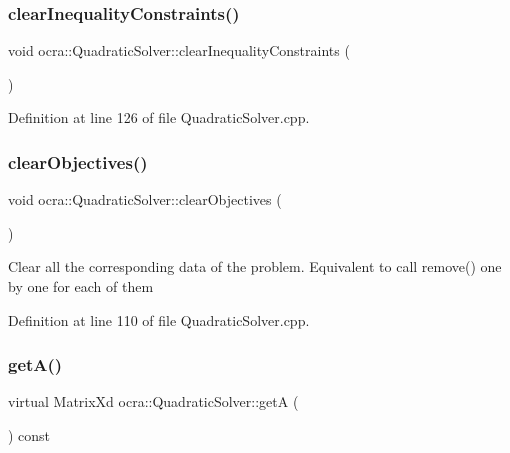 \hypertarget{classocra_1_1QuadraticSolver_ac41ecf476cf2bbe6ce17e3520e44f138}{}\label{classocra_1_1QuadraticSolver_ac41ecf476cf2bbe6ce17e3520e44f138} 
\subsubsection{\texorpdfstring{clear\+Inequality\+Constraints()}{clearInequalityConstraints()}}
{\footnotesize\ttfamily void ocra\+::\+Quadratic\+Solver\+::clear\+Inequality\+Constraints (\begin{DoxyParamCaption}{ }\end{DoxyParamCaption})}



Definition at line 126 of file Quadratic\+Solver.\+cpp.

\hypertarget{classocra_1_1QuadraticSolver_a0339ac8b860591dea7f24bc05d58fdf0}{}\label{classocra_1_1QuadraticSolver_a0339ac8b860591dea7f24bc05d58fdf0} 
\subsubsection{\texorpdfstring{clear\+Objectives()}{clearObjectives()}}
{\footnotesize\ttfamily void ocra\+::\+Quadratic\+Solver\+::clear\+Objectives (\begin{DoxyParamCaption}{ }\end{DoxyParamCaption})}

Clear all the corresponding data of the problem. Equivalent to call remove() one by one for each of them 

Definition at line 110 of file Quadratic\+Solver.\+cpp.

\hypertarget{classocra_1_1QuadraticSolver_aa3904e85d74c7c88c3605a082741b8cd}{}\label{classocra_1_1QuadraticSolver_aa3904e85d74c7c88c3605a082741b8cd} 
\subsubsection{\texorpdfstring{get\+A()}{getA()}}
{\footnotesize\ttfamily virtual Matrix\+Xd ocra\+::\+Quadratic\+Solver\+::getA (\begin{DoxyParamCaption}{ }\end{DoxyParamCaption}) const\hspace{0.3cm}{\ttfamily [pure virtual]}}



